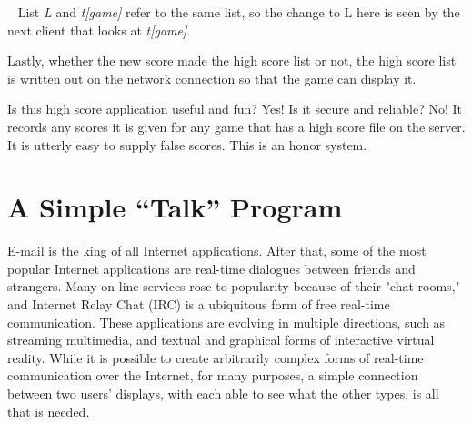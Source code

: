 
\medskip{}\ {\sffamily
List \textit{L} and \textit{t[game]} refer to the same list, so the
change to L here is seen by the next client that looks at
\textit{t[game]}.}\medskip

Lastly, whether the new score made the high score list or not, the high
score list is written out on the network connection so that the game
can display it.


Is this high score application useful and fun? Yes! Is it secure and
reliable? No! It records any scores it is given for any game that has a
high score file on the server. It is utterly easy to supply false
scores. This is an honor system.

\section{A Simple ``Talk'' Program}

E-mail is the king of all Internet applications. After that, some of the
most popular Internet applications are real-time dialogues between
friends and strangers. Many on-line services rose to popularity because
of their "chat rooms," and Internet Relay
Chat (IRC) is a ubiquitous form of free real-time
communication. These applications are evolving in multiple directions,
such as streaming multimedia, and textual and graphical forms of
interactive virtual reality. While it is possible to create arbitrarily
complex forms of real-time communication over the Internet, for many
purposes, a simple connection between two users'
displays, with each able to see what the other types, is all that is
needed.

